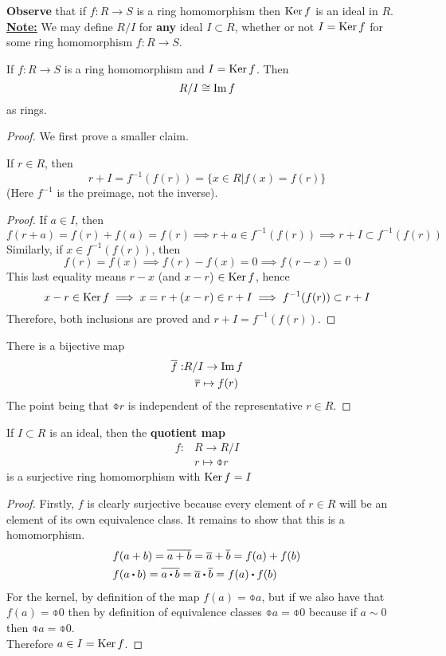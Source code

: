 \documentclass[../Main.tex]{subfiles}
\begin{document}
\textbf{Observe} that if $f:R\to S$ is a ring homomorphism then $\operatorname{Ker} f$ is an ideal in $R$.\\
\underline{\textbf{Note:}} We may define $R/I$ for \textbf{any} ideal $I\subset R$, whether or not $I=\operatorname{Ker} f$ for some ring homomorphism $f:R\to S$.
\newpage
\begin{thm}[title = The First Isomorphism Theorem]
	If $f:R\to S$ is a ring homomorphism and $I=\operatorname{Ker} f$. Then
	\[R/I\cong \operatorname{Im} f\]
	as rings.
\end{thm}
\begin{proof}
	We first prove a smaller claim.
	\begin{claim}
		If $r \in R$, then  \[r+I = f^{-1}(f(r)) =\{x\in R|f(x)=f(r)\}\]
	(Here $f^{-1}$ is the preimage, not the inverse).
	\end{claim}
	\begin{proof}
		If $a\in I$, then 
		\[f(r+a)=f(r)+f(a)=f(r) \implies r+a \in f^{-1}(f(r)) \implies r+I \subset f^{-1}(f(r))\]
		Similarly, if $x\in f^{-1}(f(r))$, then
		\[f(r)=f(x)\implies f(r)-f(x)=0\implies f(r-x)=0\]
		This last equality means $r-x$ (and $x-r$) $\in \operatorname{Ker} f$, hence
		\[x-r\in \operatorname{Ker} f \implies x = r+(x-r)\in r+I \implies
		f^{-1}(f(r)) \subset r+I \]
		Therefore, both inclusions are proved and $r+I =f^{-1}(f(r))$.
	\end{proof}
	There is a bijective map
	\begin{align*}
		\overline{f}:& R/I \to \operatorname{Im} f \\
		&\quad \overline{r} \mapsto f(r)
	\end{align*}
	The point being that $\obar{r}$ is independent of the representative $r\in R$.
\end{proof}
\begin{thm}[title = Canonical quotient map is surjective]
	If $I\subset R$ is an ideal, then the \textbf{quotient map}
	\begin{align*}
		f:&R \to R/I\\
		&r\mapsto \obar{r}
	\end{align*}
	is a surjective ring homomorphism with $\operatorname{Ker} f = I$
\end{thm}
\begin{proof}
	Firstly, $f$ is clearly surjective because every element of $r \in R$ will be an element of its own equivalence class. 
	It remains to show that this is a homomorphism.
	\begin{align*}
		&f(a+b)=\obar{a+b} = \obar{a}+\obar{b}=f(a)+f(b)\\
		&f(a\rdot b)=\obar{a\rdot b} = \obar{a}\rdot \obar{b}=f(a)\rdot f(b)
	\end{align*}
	For the kernel, by definition of the map $f(a)=\obar{a}$, but if we also have that $f(a)=\obar{0}$ then by definition of equivalence classes $\obar{a}=\obar{0}$ because if $a\sim 0$ then $\obar{a}=\obar{0}$. \\
	Therefore $a\in I = \operatorname{Ker} f$.
\end{proof}
\end{document}

